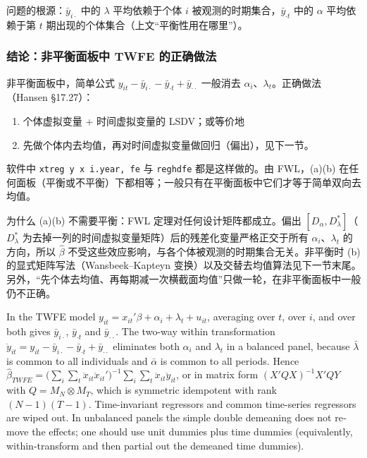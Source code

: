 问题的根源：$\bar y_{i\cdot}$ 中的 $\lambda$ 平均依赖于个体 $i$ 被观测的时期集合，$\bar y_{\cdot t}$ 中的 $\alpha$ 平均依赖于第 $t$ 期出现的个体集合（上文“平衡性用在哪里”）。

\subsubsection{结论：非平衡面板中 TWFE 的正确做法}

\begin{thm}\label{thm:U10b-unbal}
非平衡面板中，简单公式 $y_{it}-\bar y_{i\cdot}-\bar y_{\cdot t}+\bar y_{\cdot\cdot}$ 一般消去 $\alpha_i$、$\lambda_t$。正确做法（Hansen §17.27）：
\begin{enumerate}[label=(\alph*)]
  \item 个体虚拟变量 + 时间虚拟变量的 LSDV；或等价地
  \item 先做个体内去均值，再对时间虚拟变量做回归（偏出），见下一节。
\end{enumerate}
软件中 \texttt{xtreg y x i.year, fe} 与 \texttt{reghdfe} 都是这样做的。由 FWL，(a)(b) 在任何面板（平衡或不平衡）下都相等；一般只有在平衡面板中它们才等于简单双向去均值。
\end{thm}

为什么 (a)(b) 不需要平衡：FWL 定理对任何设计矩阵都成立。偏出 $[D_\alpha,D_\lambda^*]$（$D_\lambda^*$ 为去掉一列的时间虚拟变量矩阵）后的残差化变量严格正交于所有 $\alpha_i$、$\lambda_t$ 的方向，所以 $\hat\beta$ 不受这些效应影响，与各个体被观测的时期集合无关。非平衡时 (b) 的显式矩阵写法（Wansbeek--Kapteyn 变换）以及交替去均值算法见下一节末尾。另外，“先个体去均值、再每期减一次横截面均值”只做一轮，在非平衡面板中一般仍不正确。

\begin{english}
In the TWFE model $y_{it}=x_{it}'\beta+\alpha_i+\lambda_t+u_{it}$, averaging over $t$, over $i$, and over both gives $\bar y_{i\cdot}$, $\bar y_{\cdot t}$ and $\bar y_{\cdot\cdot}$. The two-way within transformation $\ddot y_{it}=y_{it}-\bar y_{i\cdot}-\bar y_{\cdot t}+\bar y_{\cdot\cdot}$ eliminates both $\alpha_i$ and $\lambda_t$ in a balanced panel, because $\bar\lambda$ is common to all individuals and $\bar\alpha$ is common to all periods. Hence $\hat\beta_{TWFE}=\bigl(\sum_i\sum_t\ddot x_{it}\ddot x_{it}'\bigr)^{-1}\sum_i\sum_t\ddot x_{it}\ddot y_{it}$, or in matrix form $(X'QX)^{-1}X'QY$ with $Q=M_N\otimes M_T$, which is symmetric idempotent with rank $(N-1)(T-1)$. Time-invariant regressors and common time-series regressors are wiped out. In unbalanced panels the simple double demeaning does not remove the effects; one should use unit dummies plus time dummies (equivalently, within-transform and then partial out the demeaned time dummies).
\end{english}

